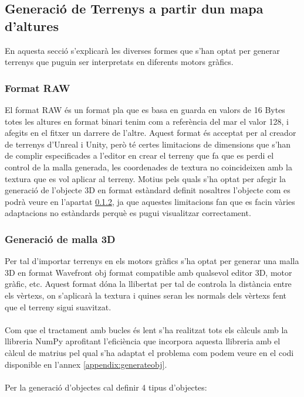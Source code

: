 \documentclass[10pt,a4paper]{article}
\begin{document}
\subsection{Generació de Terrenys a partir dun mapa d'altures}
En aquesta secció s'explicarà les diverses formes que s'han optat per generar terrenys que puguin ser interpretats en diferents motors gràfics.

\subsubsection{Format RAW}
El format RAW és un format pla que es basa en guarda en valors de 16 Bytes totes les altures en format binari tenim com a referència del mar el valor 128, i afegits en el fitxer un darrere de l'altre. Aquest format és acceptat per al creador de terrenys d'Unreal i Unity, però té certes limitacions de dimensions que s'han de complir especificades a l'editor en crear el terreny que fa que es perdi el control de la malla generada, les coordenades de textura no coincideixen amb la textura que es vol aplicar al terreny. Motius pels quals s'ha optat per afegir la generació de l'objecte 3D en format estàndard definit nosaltres l'objecte com es podrà veure en l'apartat \ref{mesh3d}, ja que aquestes limitacions fan que es facin vàries adaptacions no estàndards perquè es pugui visualitzar correctament.

\subsubsection{Generació de malla 3D}
\label{mesh3d}
Per tal d'importar terrenys en els motors gràfics s'ha optat per generar una malla 3D en format Wavefront obj\cite{wavefrontobj} format compatible amb qualsevol editor 3D, motor gràfic, etc. Aquest format dóna la llibertat per tal de controla la distància entre els vèrtexs, on s'aplicarà la textura i quines seran les normals dels vèrtexs fent que el terreny sigui suavitzat.
\\
\\
Com que el tractament amb bucles és lent s'ha realitzat tots els càlculs amb la llibreria NumPy aprofitant l'eficiència que incorpora aquesta llibreria amb el càlcul de matrius pel qual s'ha adaptat el problema com podem veure en el codi disponible en l'annex \ref{appendix:generateobj}.
\\
\\
Per la generació d'objectes cal definir 4 tipus d'objectes:
\end{document}
